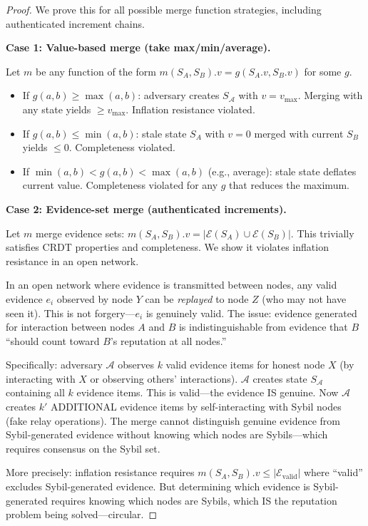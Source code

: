 \documentclass[11pt,a4paper]{article}
\newcommand{\Adv}{\mathcal{A}}
\begin{document}
\begin{proof}
We prove this for all possible merge function strategies, including authenticated increment chains.

\textbf{Case 1: Value-based merge (take max/min/average).}

Let $m$ be any function of the form $m(S_A, S_B).v = g(S_A.v, S_B.v)$ for some $g$.
\begin{itemize}[nosep]
    \item If $g(a, b) \geq \max(a, b)$: adversary creates $S_{\Adv}$ with $v = v_{\text{max}}$. Merging with any state yields $\geq v_{\text{max}}$. Inflation resistance violated.
    \item If $g(a, b) \leq \min(a, b)$: stale state $S_A$ with $v = 0$ merged with current $S_B$ yields $\leq 0$. Completeness violated.
    \item If $\min(a,b) < g(a,b) < \max(a,b)$ (e.g., average): stale state deflates current value. Completeness violated for any $g$ that reduces the maximum.
\end{itemize}

\textbf{Case 2: Evidence-set merge (authenticated increments).}

Let $m$ merge evidence sets: $m(S_A, S_B).v = |\mathcal{E}(S_A) \cup \mathcal{E}(S_B)|$. This trivially satisfies CRDT properties and completeness. We show it violates inflation resistance in an open network.

In an open network where evidence is transmitted between nodes, any valid evidence $e_i$ observed by node $Y$ can be \emph{replayed} to node $Z$ (who may not have seen it). This is not forgery---$e_i$ is genuinely valid. The issue: evidence generated for interaction between nodes $A$ and $B$ is indistinguishable from evidence that $B$ ``should count toward $B$'s reputation at all nodes.''

Specifically: adversary $\Adv$ observes $k$ valid evidence items for honest node $X$ (by interacting with $X$ or observing others' interactions). $\Adv$ creates state $S_\Adv$ containing all $k$ evidence items. This is valid---the evidence IS genuine. Now $\Adv$ creates $k'$ ADDITIONAL evidence items by self-interacting with Sybil nodes (fake relay operations). The merge cannot distinguish genuine evidence from Sybil-generated evidence without knowing which nodes are Sybils---which requires consensus on the Sybil set.

More precisely: inflation resistance requires $m(S_A, S_B).v \leq |\mathcal{E}_{\text{valid}}|$ where ``valid'' excludes Sybil-generated evidence. But determining which evidence is Sybil-generated requires knowing which nodes are Sybils, which IS the reputation problem being solved---circular.


\end{proof}
\end{document}
